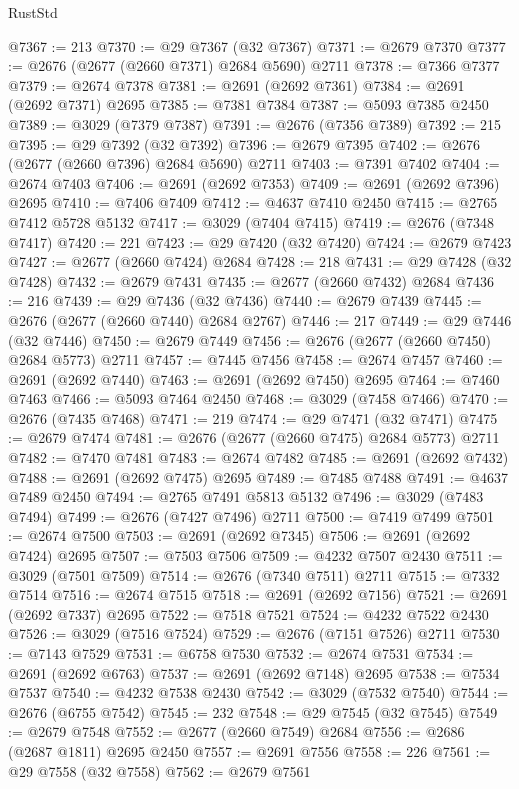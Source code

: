 \begin{lexlean}{RustStd}
\begin{coremodule}
{\begin{coremodule}
{{{{{{{{{{{{{{{{{{{{{{{{{{{{{{{{{{{{{{{{{{{{{{{{{{{{{{{@7367 := 213
@7370 := @29 @7367 (@32 @7367)
@7371 := @2679 @7370
@7377 := @2676 (@2677 (@2660 @7371) @2684 @5690) @2711
@7378 := @7366 @7377
@7379 := @2674 @7378
@7381 := @2691 (@2692 @7361)
@7384 := @2691 (@2692 @7371) @2695
@7385 := @7381 @7384
@7387 := @5093 @7385 @2450
@7389 := @3029 (@7379 @7387)
@7391 := @2676 (@7356 @7389)
@7392 := 215
@7395 := @29 @7392 (@32 @7392)
@7396 := @2679 @7395
@7402 := @2676 (@2677 (@2660 @7396) @2684 @5690) @2711
@7403 := @7391 @7402
@7404 := @2674 @7403
@7406 := @2691 (@2692 @7353)
@7409 := @2691 (@2692 @7396) @2695
@7410 := @7406 @7409
@7412 := @4637 @7410 @2450
@7415 := @2765 @7412 @5728 @5132
@7417 := @3029 (@7404 @7415)
@7419 := @2676 (@7348 @7417)
@7420 := 221
@7423 := @29 @7420 (@32 @7420)
@7424 := @2679 @7423
@7427 := @2677 (@2660 @7424) @2684
@7428 := 218
@7431 := @29 @7428 (@32 @7428)
@7432 := @2679 @7431
@7435 := @2677 (@2660 @7432) @2684
@7436 := 216
@7439 := @29 @7436 (@32 @7436)
@7440 := @2679 @7439
@7445 := @2676 (@2677 (@2660 @7440) @2684 @2767)
@7446 := 217
@7449 := @29 @7446 (@32 @7446)
@7450 := @2679 @7449
@7456 := @2676 (@2677 (@2660 @7450) @2684 @5773) @2711
@7457 := @7445 @7456
@7458 := @2674 @7457
@7460 := @2691 (@2692 @7440)
@7463 := @2691 (@2692 @7450) @2695
@7464 := @7460 @7463
@7466 := @5093 @7464 @2450
@7468 := @3029 (@7458 @7466)
@7470 := @2676 (@7435 @7468)
@7471 := 219
@7474 := @29 @7471 (@32 @7471)
@7475 := @2679 @7474
@7481 := @2676 (@2677 (@2660 @7475) @2684 @5773) @2711
@7482 := @7470 @7481
@7483 := @2674 @7482
@7485 := @2691 (@2692 @7432)
@7488 := @2691 (@2692 @7475) @2695
@7489 := @7485 @7488
@7491 := @4637 @7489 @2450
@7494 := @2765 @7491 @5813 @5132
@7496 := @3029 (@7483 @7494)
@7499 := @2676 (@7427 @7496) @2711
@7500 := @7419 @7499
@7501 := @2674 @7500
@7503 := @2691 (@2692 @7345)
@7506 := @2691 (@2692 @7424) @2695
@7507 := @7503 @7506
@7509 := @4232 @7507 @2430
@7511 := @3029 (@7501 @7509)
@7514 := @2676 (@7340 @7511) @2711
@7515 := @7332 @7514
@7516 := @2674 @7515
@7518 := @2691 (@2692 @7156)
@7521 := @2691 (@2692 @7337) @2695
@7522 := @7518 @7521
@7524 := @4232 @7522 @2430
@7526 := @3029 (@7516 @7524)
@7529 := @2676 (@7151 @7526) @2711
@7530 := @7143 @7529
@7531 := @6758 @7530
@7532 := @2674 @7531
@7534 := @2691 (@2692 @6763)
@7537 := @2691 (@2692 @7148) @2695
@7538 := @7534 @7537
@7540 := @4232 @7538 @2430
@7542 := @3029 (@7532 @7540)
@7544 := @2676 (@6755 @7542)
@7545 := 232
@7548 := @29 @7545 (@32 @7545)
@7549 := @2679 @7548
@7552 := @2677 (@2660 @7549) @2684
@7556 := @2686 (@2687 @1811) @2695 @2450
@7557 := @2691 @7556
@7558 := 226
@7561 := @29 @7558 (@32 @7558)
@7562 := @2679 @7561
}}}}}}}}}}}}}}}}}}}}}}}}}}}}}}}}}}}}}}}}}}}}}}}}}}}}}}}
\end{coremodule}}
\end{coremodule}
\end{lexlean}
